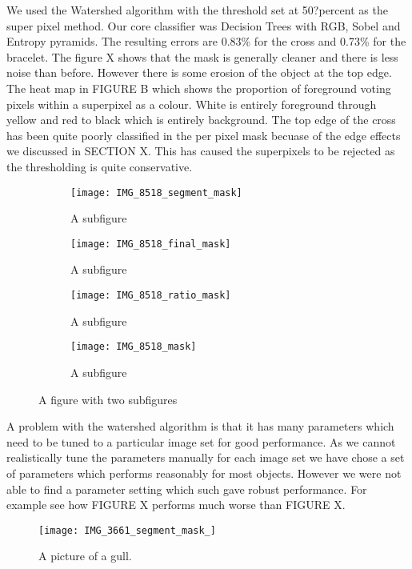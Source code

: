 \documentclass[12pt]{IIBproject}
\begin{document}
We used the Watershed algorithm with the threshold set at 50?percent as the super pixel method. Our core classifier was Decision Trees with RGB, Sobel and Entropy pyramids. The resulting errors are 0.83\% for the cross and 0.73\% for the bracelet. The figure X shows that the mask is generally cleaner and there is less noise than before. However there is some erosion of the object at the top edge. The heat map in FIGURE B which shows the proportion of foreground voting pixels within a superpixel as a colour. White is entirely foreground through yellow and red to black which is entirely background. The top edge of the cross has been quite poorly classified in the per pixel mask becuase of the edge effects we discussed in SECTION X. This has caused the superpixels to be rejected as the thresholding is quite conservative.
\begin{figure}[H]
\centering
\begin{subfigure}{.45\textwidth}
  \centering
  \texttt{[image: IMG\_8518\_segment\_mask]}
  \caption{A subfigure}
  \label{fig:sub1}
\end{subfigure}%
\begin{subfigure}{.45\textwidth}
  \centering
  \texttt{[image: IMG\_8518\_final\_mask]}
  \caption{A subfigure}
  \label{fig:sub2}
\end{subfigure}
\begin{subfigure}{.45\textwidth}
  \centering
  \texttt{[image: IMG\_8518\_ratio\_mask]}
  \caption{A subfigure}
  \label{fig:sub2}
\end{subfigure}
\begin{subfigure}{.45\textwidth}
  \centering
  \texttt{[image: IMG\_8518\_mask]}
  \caption{A subfigure}
  \label{fig:sub2}
\end{subfigure}
\caption{A figure with two subfigures}
\label{fig:test}
\end{figure}


A problem with the watershed algorithm is that it has many parameters which need to be tuned to a particular image set for good performance. As we cannot realistically tune the parameters manually for each image set we have chose a set of parameters which performs reasonably for most objects. However we were not able to find a parameter setting which such gave robust performance. For example see how FIGURE X performs much worse than FIGURE X.

\begin{figure}[H]
  \caption{A picture of a gull.}
  \centering
    \texttt{[image: IMG\_3661\_segment\_mask\_]}
\end{figure}
\end{document}
